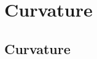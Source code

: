 \documentclass[12pt]{article}
\begin{document}
\section{Curvature}

\subsection{Curvature}


\end{document}
